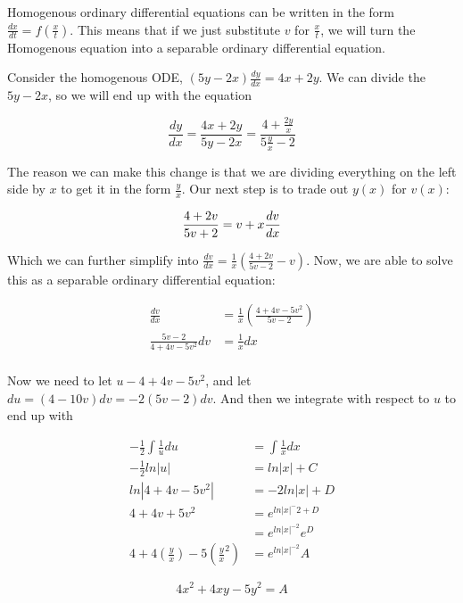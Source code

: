     Homogenous ordinary differential equations can be written in the form $\frac{dx}{dt}=f\left(\frac{x}{t}\right)$. This means that if we just substitute $v$ for $\frac{x}{t}$, we will turn the Homogenous equation into a separable ordinary differential equation.

    \begin{problem}
      Consider the homogenous ODE, $(5y-2x)\frac{dy}{dx}=4x+2y$. We can divide the $5y-2x$, so we will end up with the equation

      \begin{equation}
        \frac{dy}{dx}=\frac{4x+2y}{5y-2x}=\frac{4+\frac{2y}{x}}{5\frac{y}{x}-2}
      \end{equation}

      The reason we can make this change is that we are dividing everything on the left side by $x$ to get it in the form $\frac{y}{x}$. Our next step is to trade out $y(x)$ for $v(x)$:

      \begin{equation}
        \frac{4+2v}{5v+2}=v+x\frac{dv}{dx}\\
      \end{equation}

      Which we can further simplify into $\frac{dv}{dx}=\frac{1}{x}\left(\frac{4+2v}{5v-2}-v\right)$. Now, we are able to solve this as a separable ordinary differential equation:

      \begin{equation}
        \begin{aligned}
          \frac{dv}{dx}&=\frac{1}{x}\left(\frac{4+4v-5v^2}{5v-2}\right)\\
          \frac{5v-2}{4+4v-5v^2}dv&=\frac{1}{x}dx\\
        \end{aligned}
      \end{equation}

      Now we need to let $u-4+4v-5v^2$, and let $du=(4-10v)dv=-2(5v-2)dv$. And then we integrate with respect to $u$ to end up with 

      \begin{equation}
        \begin{aligned}
          -\frac{1}{2}\int\frac{1}{u}du&=\int\frac{1}{x}dx\\
          -\frac{1}{2}ln|u|&=ln|x|+C\\
          ln|4+4v-5v^2|&=-2ln|x|+D\\
          4+4v+5v^2&=e^{ln|x|^-2+D}\\
          &=e^{ln|x|^{-2}}e^D\\
          4+4\left(\frac{y}{x}\right)-5\left(\frac{y}{x}^2\right)&=e^{ln|x|^{-2}}A
        \end{aligned}
      \end{equation}

      \begin{equation}
        \boxed{4x^2+4xy-5y^2=A}
      \end{equation}
    \end{problem}

